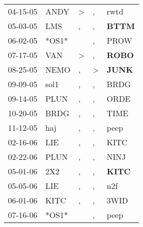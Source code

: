 \begin{supertabular}{p{0.07\textwidth}p{0.06\textwidth}p{0.02\textwidth}p{0.02\textwidth}p{0.06\textwidth}}
          04-15-05\textsuperscript{} &           ANDY\textsuperscript{} &     \textgreater &             , &           rwtd\textsuperscript{} \\
          05-03-05\textsuperscript{} &            LMS\textsuperscript{} &                , &             , &  \textbf{BTTM\textsuperscript{}} \\
          06-02-05\textsuperscript{} &                            *OS1* &                  &             , &           PROW\textsuperscript{} \\
          07-17-05\textsuperscript{} &            VAN\textsuperscript{} &     \textgreater &             , &  \textbf{ROBO\textsuperscript{}} \\
          08-25-05\textsuperscript{} &           NEMO\textsuperscript{} &                , &  \textgreater &  \textbf{JUNK\textsuperscript{}} \\
          09-09-05\textsuperscript{} &           sol1\textsuperscript{} &                , &             , &           BRDG\textsuperscript{} \\
          09-14-05\textsuperscript{} &           PLUN\textsuperscript{} &                , &             , &           ORDE\textsuperscript{} \\
          10-20-05\textsuperscript{} &           BRDG\textsuperscript{} &                , &             , &           TIME\textsuperscript{} \\
          11-12-05\textsuperscript{} &            haj\textsuperscript{} &                , &             , &           peep\textsuperscript{} \\
          02-16-06\textsuperscript{} &            LIE\textsuperscript{} &                , &             , &           KITC\textsuperscript{} \\
          02-22-06\textsuperscript{} &           PLUN\textsuperscript{} &                , &             , &           NINJ\textsuperscript{} \\
          05-01-06\textsuperscript{} &            2X2\textsuperscript{} &                , &             , &  \textbf{KITC\textsuperscript{}} \\
          05-05-06\textsuperscript{} &            LIE\textsuperscript{} &                , &             , &            n2f\textsuperscript{} \\
          06-01-06\textsuperscript{} &           KITC\textsuperscript{} &                , &             , &           3WID\textsuperscript{} \\
          07-16-06\textsuperscript{} &                            *OS1* &                  &             , &           peep\textsuperscript{} \\

\end{supertabular}
